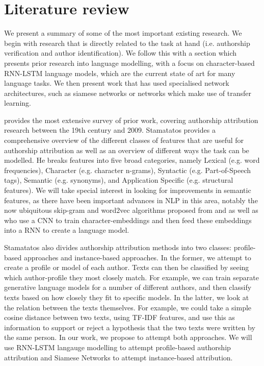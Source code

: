 \section*{Literature review}
We present a summary of some of the most important existing research. We begin with research that is directly related to the task at hand (i.e. authorship verification and author identification). We follow this with a section which presents prior research into language modelling, with a focus on character-based RNN-LSTM language models, which are the current state of art for many language tasks. We then present work that has used specialised network architectures, such as siamese networks or networks which make use of transfer learning. 

\citet{stamatatos2009survey} provides the most extensive survey of prior work, covering authorship attribution research between the 19th century and 2009. Stamatatos provides a comprehensive overview of the different classes of features that are useful for authorship attribution as well as an overview of different ways the task can be modelled. 
He breaks features into five broad categories, namely Lexical (e.g. word frequencies), Character (e.g. character n-grams), Syntactic (e.g. Part-of-Speech tags), Semantic (e.g. synonyms), and Application Specific (e.g. structural features). 
We will take special interest in looking for improvements in semantic features, as there have been important advances in NLP in this area, notably the now ubiquitous skip-gram and word2vec algorithms proposed from \cite{mikolov2013efficient} and \cite{mikolov2013distributed} as well as \citep{audhkhasi2017end} who use a CNN to train character-embeddings and then feed these embeddings into a RNN to create a language model. 

Stamatatos also divides authorship attribution methods into two classes: profile-based approaches and instance-based approaches. In the former, we attempt to create a profile or model of each author. 
Texts can then be classified by seeing which author-profile they most closely match. For example, we can train separate generative language models for a number of different authors, and then classify texts based on how closely they fit to specific models.
In the latter, we look at the relation between the texts themselves. For example, we could take a simple cosine distance between two texts, using TF-IDF features, and use this as information to support or reject a hypothesis that the two texts were written by the same person. In our work, we propose to attempt both approaches. We will use RNN-LSTM langauge modelling to attempt profile-based authorship attribution and Siamese Networks to attempt instance-based attribution.

